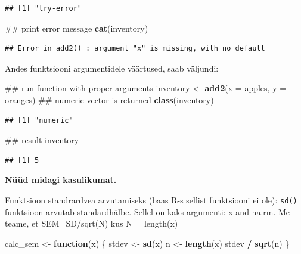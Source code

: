 \documentclass[]{book}
\newenvironment{Shaded}{\begin{snugshade}}{\end{snugshade}}
\newcommand{\KeywordTok}[1]{\textcolor[rgb]{0.13,0.29,0.53}{\textbf{#1}}}
\newcommand{\DataTypeTok}[1]{\textcolor[rgb]{0.13,0.29,0.53}{#1}}
\newcommand{\StringTok}[1]{\textcolor[rgb]{0.31,0.60,0.02}{#1}}
\newcommand{\ControlFlowTok}[1]{\textcolor[rgb]{0.13,0.29,0.53}{\textbf{#1}}}
\newcommand{\OperatorTok}[1]{\textcolor[rgb]{0.81,0.36,0.00}{\textbf{#1}}}
\newcommand{\NormalTok}[1]{#1}
\begin{document}
\begin{verbatim}
## [1] "try-error"
\end{verbatim}

\begin{Shaded}
\begin{Highlighting}[]
\NormalTok{## print error message}
\KeywordTok{cat}\NormalTok{(inventory)}
\end{Highlighting}
\end{Shaded}

\begin{verbatim}
## Error in add2() : argument "x" is missing, with no default
\end{verbatim}

Andes funktsiooni argumentidele väärtused, saab väljundi:

\begin{Shaded}
\begin{Highlighting}[]
\NormalTok{## run function with proper arguments}
\NormalTok{inventory <-}\StringTok{ }\KeywordTok{add2}\NormalTok{(}\DataTypeTok{x =}\NormalTok{ apples, }\DataTypeTok{y =}\NormalTok{ oranges)}
\NormalTok{## numeric vector is returned}
\KeywordTok{class}\NormalTok{(inventory)}
\end{Highlighting}
\end{Shaded}

\begin{verbatim}
## [1] "numeric"
\end{verbatim}

\begin{Shaded}
\begin{Highlighting}[]
\NormalTok{## result}
\NormalTok{inventory}
\end{Highlighting}
\end{Shaded}

\begin{verbatim}
## [1] 5
\end{verbatim}

\textbf{Nüüd midagi kasulikumat.}

Funktsioon standrardvea arvutamiseks (baas R-s sellist funktsiooni ei
ole): \texttt{sd()} funktsioon arvutab standardhälbe. Sellel on kaks
argumenti: x and na.rm. Me teame, et SEM=SD/sqrt(N) kus N = length(x)

\begin{Shaded}
\begin{Highlighting}[]
\NormalTok{calc_sem <-}\StringTok{ }\ControlFlowTok{function}\NormalTok{(x) \{}
\NormalTok{  stdev <-}\StringTok{ }\KeywordTok{sd}\NormalTok{(x)}
\NormalTok{  n <-}\StringTok{ }\KeywordTok{length}\NormalTok{(x)}
\NormalTok{  stdev }\OperatorTok{/}\StringTok{ }\KeywordTok{sqrt}\NormalTok{(n)}
\NormalTok{\}}
\end{Highlighting}
\end{Shaded}
\end{document}
